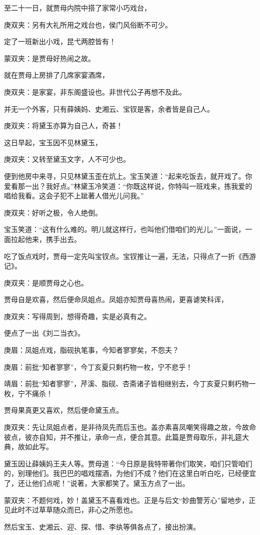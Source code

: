 \begin{parag}
    至二十一日，就贾母内院中搭了家常小巧戏台，\begin{note}庚双夹：另有大礼所用之戏台也，侯门风俗断不可少。\end{note}定了一班新出小戏，昆弋两腔皆有！\begin{note}蒙双夹：是贾母好热闹之故。\end{note}就在贾母上房排了几席家宴酒席，\begin{note}庚双夹：是家宴，非东阁盛设也。非世代公子再想不及此。\end{note}并无一个外客，只有薛姨妈、史湘云、宝钗是客，余者皆是自己人。\begin{note}庚双夹：将黛玉亦算为自己人，奇甚！\end{note}这日早起，宝玉因不见林黛玉，\begin{note}庚双夹：又转至黛玉文字，人不可少也。\end{note}便到他房中来寻，只见林黛玉歪在炕上。宝玉笑道：“起来吃饭去，就开戏了。你爱看那一出？我好点。”林黛玉冷笑道：“你既这样说，你特叫一班戏来，拣我爱的唱给我看。这会子犯不上跐著人借光儿问我。”\begin{note}庚双夹：好听之极，令人绝倒。\end{note}宝玉笑道：“这有什么难的。明儿就这样行，也叫他们借咱们的光儿。”一面说，一面拉起他来，携手出去。
\end{parag}


\begin{parag}
    吃了饭点戏时，贾母一定先叫宝钗点。宝钗推让一遍，无法，只得点了一折《西游记》。\begin{note}庚双夹：是顺贾母之心也。\end{note}贾母自是欢喜，然后便命凤姐点。凤姐亦知贾母喜热闹，更喜谑笑科诨，\begin{note}庚双夹：写得周到，想得奇趣，实是必真有之。\end{note}便点了一出《刘二当衣》。\begin{note}庚眉：凤姐点戏，脂砚执笔事，今知者寥寥矣，不怨夫？\end{note}\begin{note}庚眉：前批“知者寥寥”，今丁亥夏只剩朽物一枚，宁不悲乎！\end{note}\begin{note}靖眉：前批“知者寥寥”，芹溪、脂砚、杏斋诸子皆相继别去，今丁亥夏只剩朽物一枚，宁不痛杀！\end{note}贾母果真更又喜欢，然后便命黛玉点。\begin{note}庚双夹：先让凤姐点者，是非待凤先而后玉也。盖亦素喜凤嘲笑得趣之故，今故命彼点，彼亦自知，并不推让，承命一点，便合其意。此篇是贾母取乐，非礼筵大典，故如此写。\end{note}黛玉因让薛姨妈王夫人等。贾母道：“今日原是我特带著你们取笑，咱们只管咱们的，别理他们。我巴巴的唱戏摆酒，为他们不成？他们在这里白听白吃，已经便宜了，还让他们点呢！”说著，大家都笑了。黛玉方点了一出。\begin{note}蒙双夹：不题何戏，妙！盖黛玉不喜看戏也。正是与后文“妙曲警芳心”留地步，正见此时不过草草随众而已，非心之所愿也。\end{note}然后宝玉、史湘云、迎、探、惜、李纨等俱各点了，接出扮演。
\end{parag}


